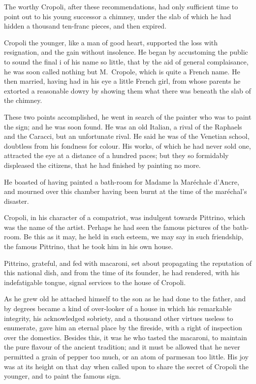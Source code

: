 The worthy Cropoli, after these recommendations, had only sufficient time to point out to his young successor a chimney, under the slab of which he had hidden a thousand ten-franc pieces, and then expired.

Cropoli the younger, like a man of good heart, supported the loss with resignation, and the gain without insolence. He began by accustoming the public to sound the final i of his name so little, that by the aid of general complaisance, he was soon called nothing but M.~Cropole, which is quite a French name. He then married, having had in his eye a little French girl, from whose parents he extorted a reasonable dowry by showing them what there was beneath the slab of the chimney.

These two points accomplished, he went in search of the painter who was to paint the sign; and he was soon found. He was an old Italian, a rival of the Raphaels and the Caracci, but an unfortunate rival. He said he was of the Venetian school, doubtless from his fondness for colour. His works, of which he had never sold one, attracted the eye at a distance of a hundred paces; but they so formidably displeased the citizens, that he had finished by painting no more.

He boasted of having painted a bath-room for Madame la Maréchale d'Ancre, and mourned over this chamber having been burnt at the time of the maréchal's disaster.

Cropoli, in his character of a compatriot, was indulgent towards Pittrino, which was the name of the artist. Perhaps he had seen the famous pictures of the bath-room. Be this as it may, he held in such esteem, we may say in such friendship, the famous Pittrino, that he took him in his own house.

Pittrino, grateful, and fed with macaroni, set about propagating the reputation of this national dish, and from the time of its founder, he had rendered, with his indefatigable tongue, signal services to the house of Cropoli.

As he grew old he attached himself to the son as he had done to the father, and by degrees became a kind of over-looker of a house in which his remarkable integrity, his acknowledged sobriety, and a thousand other virtues useless to enumerate, gave him an eternal place by the fireside, with a right of inspection over the domestics. Besides this, it was he who tasted the macaroni, to maintain the pure flavour of the ancient tradition; and it must be allowed that he never permitted a grain of pepper too much, or an atom of parmesan too little. His joy was at its height on that day when called upon to share the secret of Cropoli the younger, and to paint the famous sign.


